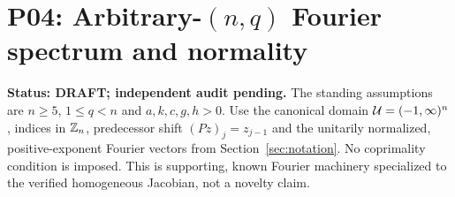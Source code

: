 
\section{P04: Arbitrary-\texorpdfstring{$(n,q)$}{(n,q)} Fourier spectrum and normality}
\label{sec:P04}
\noindent\textbf{Status: DRAFT; independent audit pending.}
The standing assumptions are $n\ge5$, $1\le q<n$ and
$a,k,c,g,h>0$. Use the canonical domain $\mathcal{U}=(-1,\infty)^n$,
indices in $\mathbb{Z}_n$, predecessor shift $(Pz)_j=z_{j-1}$ and the
unitarily normalized, positive-exponent Fourier vectors from
Section~\ref{sec:notation}. No coprimality condition is imposed.
This is supporting, known Fourier machinery specialized to the
verified homogeneous Jacobian, not a novelty claim.

